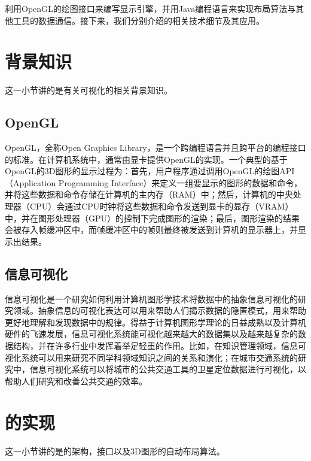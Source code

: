 利用\textsf{OpenGL}的绘图接口来编写显示引擎，并用Java编程语言来实现布局算法与其他工具的数据通信。接下来，我们分别介绍的相关技术细节及其应用。

\section{背景知识}
这一小节讲的是有关可视化的相关背景知识。
\subsection{OpenGL}\label{vmdv:opengl}
\textsf{OpenGL}，全称Open Graphics Library，是一个跨编程语言并且跨平台的编程接口的标准。在计算机系统中，通常由显卡提供\textsf{OpenGL}的实现。一个典型的基于\textsf{OpenGL}的3D图形的显示过程为：首先，用户程序通过调用\textsf{OpenGL}的绘图\textsf{API}（Application Programming Interface）来定义一组要显示的图形的数据和命令，并将这些数据和命令存储在计算机的主内存（RAM）中；然后，计算机的中央处理器（CPU）会通过CPU时钟将这些数据和命令发送到显卡的显存（VRAM）中，并在图形处理器（GPU）的控制下完成图形的渲染；最后，图形渲染的结果会被存入帧缓冲区中，而帧缓冲区中的帧则最终被发送到计算机的显示器上，并显示出结果。

\subsection{信息可视化}
信息可视化是一个研究如何利用计算机图形学技术将数据中的抽象信息可视化的研究领域。抽象信息的可视化表达可以用来帮助人们揭示数据的隐匿模式，用来帮助更好地理解和发现数据中的规律。得益于计算机图形学理论的日益成熟以及计算机硬件的飞速发展，信息可视化系统能可视化越来越大的数据集以及越来越复杂的数据结构，并在许多行业中发挥着举足轻重的作用。比如，在知识管理领域，信息可视化系统可以用来研究不同学科领域知识之间的关系和演化\cite{ZHHW16}；在城市交通系统的研究中，信息可视化系统可以将城市的公共交通工具的卫星定位数据进行可视化，以帮助人们研究和改善公共交通的效率\cite{FYL15}。

\section{的实现}
这一小节讲的是的架构，接口以及3D图形的自动布局算法。
